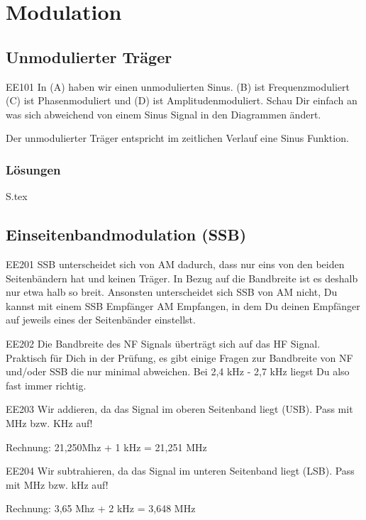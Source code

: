 \documentclass[10pt,a4paper,ngerman]{article}
\theoremstyle{definition}
\theoremstyle{plain}
\theoremstyle{mytheorem}
\theoremstyle{definition}
\newenvironment{ohmchapter}{}
{
  \subsubsection*{Lösungen}
  S\arabic{subsection}.tex}
}
\begin{document}
\section{Modulation} \label{sec:modulation}
\subsection{Unmodulierter Träger}


\begin{sol}{EE101}
  In (A) haben wir einen unmodulierten Sinus. (B) ist Frequenzmoduliert (C) ist Phasenmoduliert und (D) ist Amplitudenmoduliert. Schau Dir einfach an was sich abweichend von einem Sinus Signal in den Diagrammen ändert.
\end{sol}

\begin{ohmchapter}
  Der unmodulierter Träger entspricht im zeitlichen Verlauf eine Sinus Funktion.

\end{ohmchapter}  

\subsection{Einseitenbandmodulation (SSB)}

\begin{sol}{EE201}
  SSB unterscheidet sich von AM dadurch, dass nur eins von den beiden Seitenbändern hat und keinen Träger. In Bezug auf die Bandbreite ist es deshalb nur etwa halb so breit. Ansonsten unterscheidet sich SSB von AM nicht, Du kannst mit einem SSB Empfänger AM Empfangen, in dem Du deinen Empfänger auf jeweils eines der Seitenbänder einstellst.
\end{sol}

\begin{sol}{EE202}
  Die Bandbreite des NF Signals überträgt sich auf das HF Signal. Praktisch für Dich in der Prüfung, es gibt einige Fragen zur Bandbreite von NF und/oder SSB die nur minimal abweichen. Bei 2,4 kHz - 2,7 kHz liegst Du also fast immer richtig.

\end{sol}

\begin{sol}{EE203}
  Wir addieren, da das Signal im oberen Seitenband liegt (USB). Pass mit MHz bzw. KHz auf!
  
  Rechnung: 21,250Mhz + 1 kHz = 21,251 MHz 
\end{sol}

\begin{sol}{EE204}
  Wir subtrahieren, da das Signal im unteren Seitenband liegt (LSB). Pass mit MHz bzw. kHz auf!
  
  Rechnung: 3,65 Mhz + 2 kHz = 3,648 MHz 
\end{sol}
\end{document}
